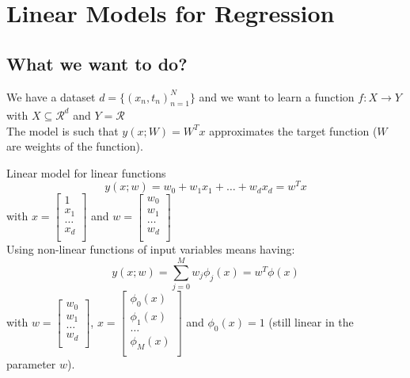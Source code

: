 \section{Linear Models for Regression}
\subsection{What we want to do?}
We have a dataset $d = \{(x_{n}, t_{n})_{n=1}^{N}\}$ and we want to learn a function $f: X \xrightarrow[]{}Y$ with $X \subseteq \mathcal{R}^{d}$ and $Y = \mathcal{R}$ \\
The model is such that $y(x; W) = W^{T}x$ approximates the target function ($W$ are weights of the function).

Linear model for linear functions
\begin{equation}
    y(x;w) = w_{0} + w_{1}x_{1} + \dots + w_{d}x_{d} = w^{T}x
\end{equation}
with $x = \begin{bmatrix} 1\\ x_{1} \\ \dots \\ x_{d} \\ \end{bmatrix}$ and $w = \begin{bmatrix} w_{0}\\ w_{1} \\ \dots \\ w_{d} \\ \end{bmatrix}$\\
Using non-linear functions of input variables means having:
\begin{equation}
    y(x;w) = \sum_{j=0}^{M}w_{j}\phi_{j}(x) = w^{T}\phi(x)
\end{equation}
with $w = \begin{bmatrix} w_{0}\\ w_{1} \\ \dots \\ w_{d} \\ \end{bmatrix}$,  $x = \begin{bmatrix} \phi_{0}(x)\\ \phi_{1}(x) \\ \dots \\ \phi_{M}(x) \\ \end{bmatrix}$ and $\phi_{0}(x) = 1$ (still linear in the parameter $w$).

